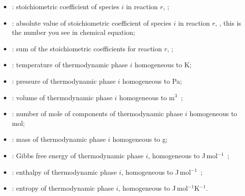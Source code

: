 \begin{itemize}
\item \scoef[i,r]:        stoichiometric coefficient of species $i$ in reaction $r$, \nounit;
\item \scoefabs[i,r]:     absolute value of stoichiometric coefficient of species $i$ in reaction $r$, \nounit, this is the number
                            you see in chemical equation;
\item \sumscoef[r]:       sum of the stoichiometric coefficients for reaction $r$, \nounit;
\item \Temp[i]:           temperature of thermodynamic  phase $i$ homogeneous to \unit{K}; 
\item \Press[i]:          pressure of thermodynamic  phase $i$ homogeneous to \unit{Pa}; 
\item \Vol[i]:            volume of thermodynamic  phase $i$ homogeneous to \unit{m$^3$}; 
\item \Mol[i]:            number of mole of components of thermodynamic  phase $i$ homogeneous to \unit{mol}; 
\item \Mass[i]:           mass of thermodynamic  phase $i$ homogeneous to \unit{g}; 
\item \Gibbs[i]:          Gibbs free energy of thermodynamic phase $i$, homogeneous to \unit{J\,mol$^{-1}$};
\item \Enth[i]:           enthalpy of thermodynamic phase $i$, homogeneous to \unit{J\,mol$^{-1}$};
\item \Entr[i]:           entropy of thermodynamic phase $i$, homogeneous to \unit{J\,mol$^{-1}$K$^{-1}$}.
\end{itemize}
%
